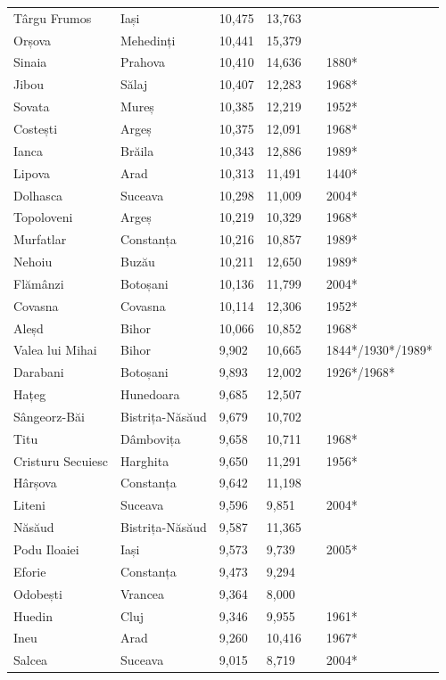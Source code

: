 \documentclass{article}
\begin{document}
\begin{tabular}{llllll}
Târgu Frumos & Iași & 10,475 & 13,763 &  &  \\
Orșova & Mehedinți & 10,441 & 15,379 &  &  \\
Sinaia & Prahova & 10,410 & 14,636 &  & 1880* \\
Jibou & Sălaj & 10,407 & 12,283 &  & 1968* \\
Sovata & Mureș & 10,385 & 12,219 &  & 1952* \\
Costești & Argeș & 10,375 & 12,091 &  & 1968* \\
Ianca & Brăila & 10,343 & 12,886 &  & 1989* \\
Lipova & Arad & 10,313 & 11,491 &  & 1440* \\
Dolhasca & Suceava & 10,298 & 11,009 &  & 2004* \\
Topoloveni & Argeș & 10,219 & 10,329 &  & 1968* \\
Murfatlar & Constanța & 10,216 & 10,857 &  & 1989* \\
Nehoiu & Buzău & 10,211 & 12,650 &  & 1989* \\
Flămânzi & Botoșani & 10,136 & 11,799 &  & 2004* \\
Covasna & Covasna & 10,114 & 12,306 &  & 1952* \\
Aleșd & Bihor & 10,066 & 10,852 &  & 1968* \\
Valea lui Mihai & Bihor & 9,902 & 10,665 &  & 1844*/1930*/1989* \\
Darabani & Botoșani & 9,893 & 12,002 &  & 1926*/1968* \\
Hațeg & Hunedoara & 9,685 & 12,507 &  &  \\
Sângeorz-Băi & Bistrița-Năsăud & 9,679 & 10,702 &  &  \\
Titu & Dâmbovița & 9,658 & 10,711 &  & 1968* \\
Cristuru Secuiesc & Harghita & 9,650 & 11,291 &  & 1956* \\
Hârșova & Constanța & 9,642 & 11,198 &  &  \\
Liteni & Suceava & 9,596 & 9,851 &  & 2004* \\
Năsăud & Bistrița-Năsăud & 9,587 & 11,365 &  &  \\
Podu Iloaiei & Iași & 9,573 & 9,739 &  & 2005* \\
Eforie & Constanța & 9,473 & 9,294 &  &  \\
Odobești & Vrancea & 9,364 & 8,000 &  &  \\
Huedin & Cluj & 9,346 & 9,955 &  & 1961* \\
Ineu & Arad & 9,260 & 10,416 &  & 1967* \\
Salcea & Suceava & 9,015 & 8,719 &  & 2004* \\

\end{tabular}
\end{document}
